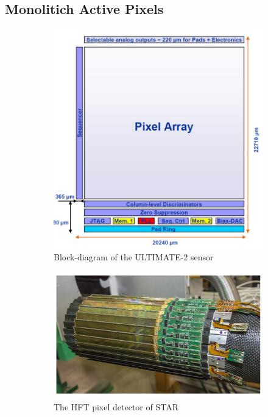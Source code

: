     \subsection{Monolitich Active Pixels}
        \begin{figure}
            \centering
            \begin{subfigure}[b]{0.49\textwidth}
                \centering
                \includegraphics[width=\linewidth]{figures/pixel_detectors_usage/MIMOSA.png}          
                \caption{Block-diagram of the ULTIMATE-2 sensor}
                \label{fig:MIMOSA}
            \end{subfigure}
            \hfill
            \begin{subfigure}[b]{0.49\textwidth}
                \centering
                \includegraphics[width=\linewidth]{figures/pixel_detectors_usage/STAR.png}
                \caption{The HFT pixel detector of STAR}
                \label{fig:HFT}
            \end{subfigure}
            \caption{}
            \label{fig:EUDET_STAR}
       \end{figure}
